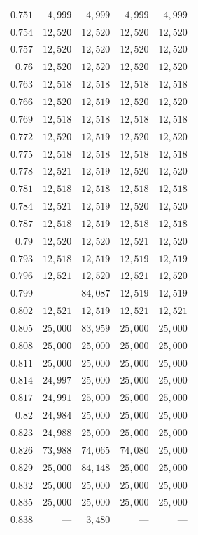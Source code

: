 \begin{singlespace}
\begin{longtable}{@{}rrrrr@{}}
$0.751$ & $4{,}999$ & $4{,}999$ & $4{,}999$ & $4{,}999$ \\
$0.754$ & $12{,}520$ & $12{,}520$ & $12{,}520$ & $12{,}520$ \\
$0.757$ & $12{,}520$ & $12{,}520$ & $12{,}520$ & $12{,}520$ \\
$0.76$ & $12{,}520$ & $12{,}520$ & $12{,}520$ & $12{,}520$ \\
$0.763$ & $12{,}518$ & $12{,}518$ & $12{,}518$ & $12{,}518$ \\
$0.766$ & $12{,}520$ & $12{,}519$ & $12{,}520$ & $12{,}520$ \\
$0.769$ & $12{,}518$ & $12{,}518$ & $12{,}518$ & $12{,}518$ \\
$0.772$ & $12{,}520$ & $12{,}519$ & $12{,}520$ & $12{,}520$ \\
$0.775$ & $12{,}518$ & $12{,}518$ & $12{,}518$ & $12{,}518$ \\
$0.778$ & $12{,}521$ & $12{,}519$ & $12{,}520$ & $12{,}520$ \\
$0.781$ & $12{,}518$ & $12{,}518$ & $12{,}518$ & $12{,}518$ \\
$0.784$ & $12{,}521$ & $12{,}519$ & $12{,}520$ & $12{,}520$ \\
$0.787$ & $12{,}518$ & $12{,}519$ & $12{,}518$ & $12{,}518$ \\
$0.79$ & $12{,}520$ & $12{,}520$ & $12{,}521$ & $12{,}520$ \\
$0.793$ & $12{,}518$ & $12{,}519$ & $12{,}519$ & $12{,}519$ \\
$0.796$ & $12{,}521$ & $12{,}520$ & $12{,}521$ & $12{,}520$ \\
$0.799$ & --- & $84{,}087$ & $12{,}519$ & $12{,}519$ \\
$0.802$ & $12{,}521$ & $12{,}519$ & $12{,}521$ & $12{,}521$ \\
$0.805$ & $25{,}000$ & $83{,}959$ & $25{,}000$ & $25{,}000$ \\
$0.808$ & $25{,}000$ & $25{,}000$ & $25{,}000$ & $25{,}000$ \\
$0.811$ & $25{,}000$ & $25{,}000$ & $25{,}000$ & $25{,}000$ \\
$0.814$ & $24{,}997$ & $25{,}000$ & $25{,}000$ & $25{,}000$ \\
$0.817$ & $24{,}991$ & $25{,}000$ & $25{,}000$ & $25{,}000$ \\
$0.82$ & $24{,}984$ & $25{,}000$ & $25{,}000$ & $25{,}000$ \\
$0.823$ & $24{,}988$ & $25{,}000$ & $25{,}000$ & $25{,}000$ \\
$0.826$ & $73{,}988$ & $74{,}065$ & $74{,}080$ & $25{,}000$ \\
$0.829$ & $25{,}000$ & $84{,}148$ & $25{,}000$ & $25{,}000$ \\
$0.832$ & $25{,}000$ & $25{,}000$ & $25{,}000$ & $25{,}000$ \\
$0.835$ & $25{,}000$ & $25{,}000$ & $25{,}000$ & $25{,}000$ \\
$0.838$ & --- & $3{,}480$ & --- & --- \\
\end{longtable}
\end{singlespace}
\endgroup
